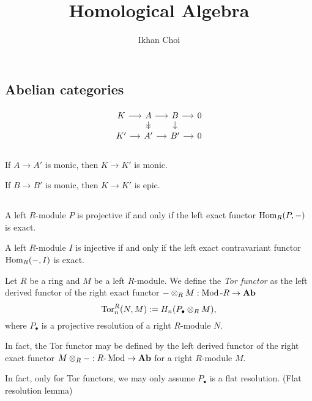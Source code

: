 \documentclass{../../large}
\newcommand{\Ab}{\mathbf{Ab}}
\begin{document}
\title{Homological Algebra}
\author{Ikhan Choi}
\maketitle
\tableofcontents


\part{}

\chapter{Abelian categories}

\[\begin{tikzcd}[sep=small]
K \rar & A \rar\dar[->>] & B \rar\dar & 0\\
K' \rar & A' \rar & B' \rar & 0\\
\end{tikzcd}\]
\begin{parts}
\item If $A\to A'$ is monic, then $K\to K'$ is monic.
\item If $B\to B'$ is monic, then $K\to K'$ is epic.
\end{parts}


\chapter{}

A left $R$-module $P$ is projective if and only if the left exact functor $\operatorname{Hom}_R(P,-)$ is exact.

A left $R$-module $I$ is injective if and only if the left exact contravariant functor $\operatorname{Hom}_R(-,I)$ is exact.


\begin{prb}
Let $R$ be a ring and $M$ be a left $R$-module.
We define the \emph{Tor functor} as the left derived functor of the right exact functor $-\otimes_RM:\Mod\text{-}R\to\Ab$
\[\operatorname{Tor}_n^R(N,M):=H_n(P_\bullet\otimes_RM),\]
where $P_\bullet$ is a projective resolution of a right $R$-module $N$.
\begin{parts}
\item In fact, the Tor functor may be defined by the left derived functor of the right exact functor $M\otimes_R-:R\text{-}\Mod\to\Ab$ for a right $R$-module $M$.
\item In fact, only for Tor functors, we may only assume $P_\bullet$ is a flat resolution. (Flat resolution lemma)
\end{parts}
\end{prb}
\end{document}
